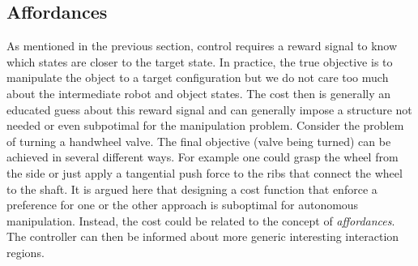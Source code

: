 \subsection{Affordances}
As mentioned in the previous section, control requires a reward signal to know which states are closer to the target state. In practice, the true objective is to manipulate the object to a target configuration but we do not care too much about the intermediate robot and object states. The cost then is generally an educated guess about this reward signal and can generally impose a structure not needed or even subpotimal for the manipulation problem. Consider the problem of turning a handwheel valve. The final objective (valve being turned) can be achieved in several different ways. For example one could grasp the wheel from the side or just apply a tangential push force to the ribs that connect the wheel to the shaft. It is argued here that designing a cost function that enforce a preference for one or the other approach is suboptimal for autonomous manipulation. Instead, the cost could be related to the concept of \emph{affordances}. The controller can then be informed about more generic interesting interaction regions.

